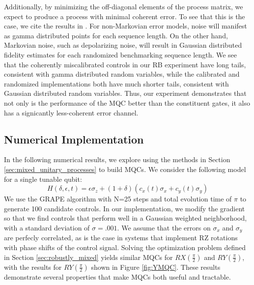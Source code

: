\documentclass[aps,nofootinbib,pra,notitlepage,twocolumn]{revtex4-1}
\begin{document}
Additionally, by minimizing the off-diagonal elements of the process matrix, we expect to produce a process with minimal coherent error. To see that this is the case, we cite the results in \cite{Ball2016}. For non-Markovian error models, noise will manifest as gamma distributed points for each sequence length. On the other hand, Markovian noise, such as depolarizing noise, will result in Gaussian distributed fidelity estimates for each randomized benchmarking sequence length. We see that the coherently miscalibrated controls in our RB experiment have long tails, consistent with gamma distributed random variables, while the calibrated and randomized implementations both have much shorter tails, consistent with Gaussian distributed random variables. Thus, our experiment demonstrates that not only is the performance of the MQC better than the constituent gates, it also has a signicantly less-coherent error channel.


\subsection{Numerical Implementation}
\label{sec:numerical_results}
In the following numerical results, we explore using the methods in Section \ref{sec:mixed_unitary_processes} to build MQCs. We consider the following model for a single tunable qubit: 
\begin{equation}\label{eq:1Qham}
  H(\delta, \epsilon, t) = \epsilon\sigma_z + (1 + \delta)(c_x(t)\sigma_x + c_y(t)\sigma_y)
\end{equation}
We use the GRAPE algorithm\cite{Khaneja2005} with N=25 steps and total evolution time of $\pi$ to generate 100 candidate controls. In our implementation, we modify the gradient so that we find controls that perform well in a Gaussian weighted neighborhood, with a standard deviation of $\sigma=.001$. We assume that the errors on $\sigma_x$ and $\sigma_y$ are perfecly correlated, as is the case in systems that implement RZ rotations with phase shifts of the control signal. Solving the optimization problem defined in Section \ref{sec:robustly_mixed} yields similar MQCs for $RX(\frac{\pi}{2})$ and $RY(\frac{\pi}{2})$, with the results for $RY(\frac{\pi}{2})$ shown in Figure \ref{fig:YMQC}. These results demonstrate several properties that make MQCs both useful and tractable.
\end{document}
